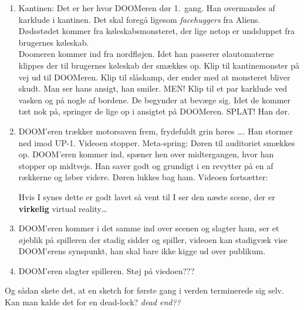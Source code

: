 \documentclass[10pt]{article}
\begin{document}
\begin{sketch}
\begin{enumerate}
\item Kantinen: Det er her hvor DOOMeren dør 1.\ gang. Han overmandes af
  karklude i kantinen. Det skal foregå ligesom {\em facehuggers} fra
  Aliens. Dødsstødet kommer fra køleskabsmonsteret, der lige netop er
  undsluppet fra brugernes køleskab.\\
  Doomeren kommer ind fra nordfløjen. Idet han passerer ølautomaterne
  klippes der til brugernes køleskab der smækkes op. Klip til
  kantinemonster på vej ud til DOOMeren. Klip til slåskamp, der ender med
  at monsteret bliver skudt. Man ser hans ansigt, han smiler. MEN! Klip til
  et par karklude ved vasken og på nogle af bordene. De begynder at bevæge
  sig. Idet de kommer tæt nok på, springer de lige op i ansigtet på
  DOOMeren. SPLAT! Han dør. 

\item DOOM'eren trækker motorsaven frem, frydefuldt grin høres \ldots. Han
  stormer ned imod UP-1. Videoen stopper. Meta-spring: Døren til auditoriet
  smækkes op. DOOM'eren kommer ind, spæner hen over midtergangen, hvor han
  stopper op midtvejs. Han saver godt og grundigt i en revytter på en af
  rækkerne og løber videre. Døren lukkes bag ham. Videoen fortsætter:

   Hvis I synes dette er godt lavet så vent til I ser den
  næste scene, der er {\bf virkelig} virtual reality\ldots

\item DOOM'eren kommer i det samme ind over scenen og slagter ham, ser et
  øjeblik på spilleren der stadig sidder og spiller, videoen kan stadigvæk
  vise DOOM'erens synspunkt, han skal bare ikke kigge ud over
  publikum. 


\item DOOM'eren slagter spilleren. Støj på viedoen???

\end{enumerate}


 Og sådan skete det, at en sketch for første gang i verden
terminerede sig selv. Kan man kalde det for en dead-lock? {\em dead end??}

\end{sketch}
\end{document}
